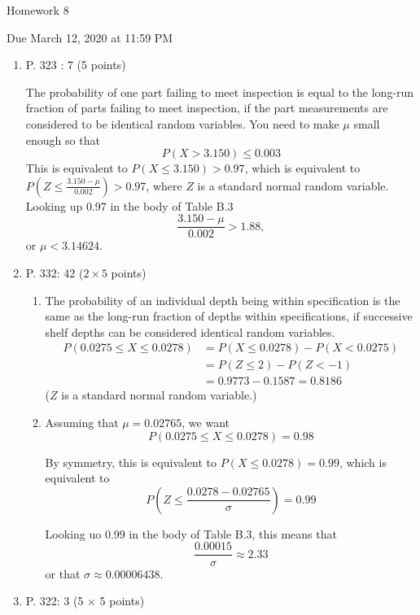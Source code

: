 \documentclass{article}\usepackage[]{graphicx}\usepackage[]{color}
\begin{document}
\begin{center} \LARGE
Homework 8
\end{center}
\begin{center} \Large
Due March 12, 2020 at 11:59 PM 
\end{center}



\begin{enumerate}
	
	\item P. 323 : 7 (5 points)

{\color{red} 
  The probability of one part failing to meet inspection is equal to the long-run fraction of parts failing to meet inspection, if the part measurements are considered to be identical random variables. You need to make $\mu$ small enough so that
  \[P(X > 3.150) \leq 0.003\]
  This is equivalent to $P(X \leq 3.150) > 0.97$, which is equivalent to $P\left(Z \leq \frac{3.150 - \mu}{0.002}\right) > 0.97$, where $Z$ is a standard normal random variable. Looking up 0.97 in the body of Table B.3 
  \[\frac{3.150 - \mu}{0.002} > 1.88,\]
  or $\mu < 3.14624.$
}
	\item P. 332: 42 ($2 \times 5$ points)
	
	\begin{enumerate}
	\item
	The probability of an individual depth being within specification is the same as the long-run fraction of depths within specifications, if successive shelf depths can be considered identical random variables.
	\begin{align*}
	P(0.0275 \leq X \leq 0.0278) & = P(X \leq 0.0278) - P(X < 0.0275)\\
	& = P(Z \leq 2) - P(Z < -1)\\
	& = 0.9773 - 0.1587 = 0.8186
\end{align*}	
	($Z$ is a standard normal random variable.)
	
	\item
	Assuming that $\mu = 0.02765$, we want
	\[P(0.0275 \leq X \leq 0.0278) = 0.98\]
	
By symmetry, this is equivalent to $P(X \leq 0.0278) = 0.99$, which is equivalent to 
\[P\left(Z \leq \frac{0.0278 - 0.02765}{\sigma}\right) = 0.99\]

Looking uo 0.99 in the body of Table B.3, this means that
\[\frac{0.00015}{\sigma} \approx 2.33\]
or that $\sigma \approx 0.00006438.$
	\end{enumerate}
	\item P. 322: 3 (5 $\times$ 5 points)
	

\end{enumerate}
\end{document}
